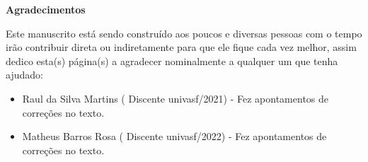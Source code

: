 \begingroup
\thispagestyle{empty}
\begin{center}
	{\normalfont\fontsize{20}{20}\sffamily\selectfont \textbf{Agradecimentos}}\par
\end{center}

\vspace{1cm}

Este manuscrito está sendo construído aos poucos e diversas pessoas com o tempo irão contribuir direta ou indiretamente para que ele fique cada vez melhor, assim dedico esta(s) página(s) a agradecer nominalmente a qualquer um que tenha ajudado:

\begin{itemize}
	\item {\color{red}Raul da Silva Martins} ({\color{blue} Discente univasf/2021}) - Fez apontamentos de correções no texto.
	\item {\color{red}Matheus Barros Rosa} ({\color{blue} Discente univasf/2022}) - Fez apontamentos de correções no texto.
\end{itemize}

\endgroup